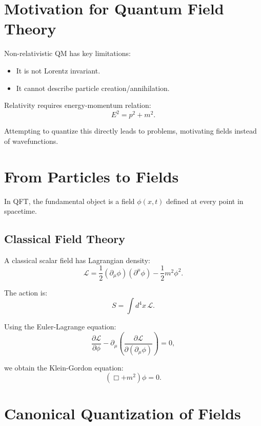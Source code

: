 \documentclass[11pt]{article}
\begin{document}
\section{Motivation for Quantum Field Theory}

Non-relativistic QM has key limitations:
\begin{itemize}
\item It is not Lorentz invariant.
\item It cannot describe particle creation/annihilation.
\end{itemize}

Relativity requires energy-momentum relation:
\begin{equation}
E^2 = p^2 + m^2.
\end{equation}

Attempting to quantize this directly leads to problems, motivating fields instead of wavefunctions.

\section{From Particles to Fields}

In QFT, the fundamental object is a field $\phi(x,t)$ defined at every point in spacetime.

\subsection{Classical Field Theory}

A classical scalar field has Lagrangian density:
\begin{equation}
\mathcal{L} = \frac{1}{2}(\partial_\mu \phi)(\partial^\mu \phi) - \frac{1}{2} m^2 \phi^2.
\end{equation}

The action is:
\begin{equation}
S = \int d^4x \, \mathcal{L}.
\end{equation}

Using the Euler-Lagrange equation:
\begin{equation}
\frac{\partial \mathcal{L}}{\partial \phi} - \partial_\mu \left(\frac{\partial \mathcal{L}}{\partial (\partial_\mu \phi)}\right) = 0,
\end{equation}

we obtain the Klein-Gordon equation:
\begin{equation}
(\Box + m^2)\phi = 0.
\end{equation}

\section{Canonical Quantization of Fields}
\end{document}
